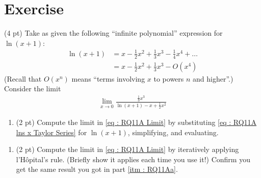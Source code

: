 %
%
%
%

\section{Exercise}


(4 pt) Take as given the following ``infinite polynomial'' expression for $\ln(x + 1)$:
\begin{align}
\ln(x + 1)
&=
x - \frac{1}{2} x^{2} + \frac{1}{3} x^{3} - \frac{1}{4} x^{4} + \ldots%
\nonumber
\\
&=
x - \frac{1}{2} x^{2} + \frac{1}{3} x^{3} - O(x^{4})%
\label{eq : RQ11A lns x Taylor Series}
\end{align}
(Recall that $O(x^{n})$ means ``terms involving $x$ to powers $n$ and higher''.) Consider the limit
\begin{align}
\lim_{x \rightarrow 0} \frac{\frac{1}{3} x^{3}}{\ln(x + 1) - x + \frac{1}{2} x^{2}}%
\label{eq : RQ11A Limit}
\end{align}

\begin{enumerate}[label=(\alph*)]
\item\label{itm : RQ11Aa} (2 pt) Compute the limit in \eqref{eq : RQ11A Limit} by substituting \eqref{eq : RQ11A lns x Taylor Series} for $\ln(x + 1)$, simplifying, and evaluating.
\end{enumerate}




\begin{enumerate}[resume,label=(\alph*)]
\item\label{itm : RQ11Ab} (2 pt) Compute the limit in \eqref{eq : RQ11A Limit} by iteratively applying l'H\^{o}pital's rule. (Briefly show it applies each time you use it!) Confirm you get the same result you got in part \ref{itm : RQ11Aa}.
\end{enumerate}

\spaceSolution{3in}{%
}%